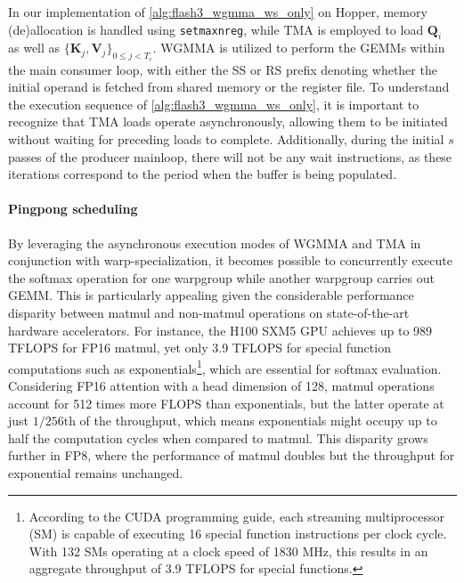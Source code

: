 In our implementation of \cref{alg:flash3_wgmma_ws_only} on Hopper, memory (de)allocation is handled using \verb|setmaxnreg|, while TMA is employed to load $\mathbf{Q}_i$ as well as $\{ \mathbf{K}_j, \mathbf{V}_j \}_{0 \leq j < T_c}$. WGMMA is utilized to perform the GEMMs within the main consumer loop, with either the SS or RS prefix denoting whether the initial operand is fetched from shared memory or the register file. To understand the execution sequence of \cref{alg:flash3_wgmma_ws_only}, it is important to recognize that TMA loads operate asynchronously, allowing them to be initiated without waiting for preceding loads to complete. Additionally, during the initial $s$ passes of the producer mainloop, there will not be any wait instructions, as these iterations correspond to the period when the buffer is being populated.

\paragraph{Pingpong scheduling} By leveraging the asynchronous execution modes of WGMMA and TMA in conjunction with warp-specialization, it becomes possible to concurrently execute the softmax operation for one warpgroup while another warpgroup carries out GEMM. This is particularly appealing given the considerable performance disparity between matmul and non-matmul operations on state-of-the-art hardware accelerators. For instance, the H100 SXM5 GPU achieves up to 989 TFLOPS for FP16 matmul, yet only 3.9 TFLOPS for special function computations such as exponentials\footnote{According to the CUDA programming guide, each streaming multiprocessor (SM) is capable of executing 16 special function instructions per clock cycle. With 132 SMs operating at a clock speed of 1830 MHz, this results in an aggregate throughput of 3.9 TFLOPS for special functions.}, which are essential for softmax evaluation. Considering FP16 attention with a head dimension of 128, matmul operations account for 512 times more FLOPS than exponentials, but the latter operate at just $1/256$th of the throughput, which means exponentials might occupy up to half the computation cycles when compared to matmul. This disparity grows further in FP8, where the performance of matmul doubles but the throughput for exponential remains unchanged.


